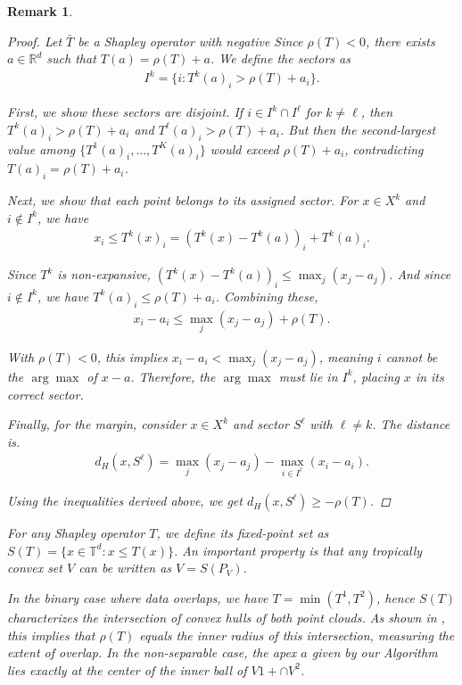 \documentclass{article}
\newtheorem{remark}{Remark}
\newcommand{\R}{\mathbb{R}}
\newcommand{\trop}{\mathbb{T}}
\begin{document}
\begin{remark}
\begin{proof}
Let $\bar{T}$ be a Shapley operator with negative 
Since $\rho(T) < 0$, there exists $a \in \R^d$ such that $T(a) = \rho(T) + a$. We define the sectors as
\begin{align}
I^k = \{i : T^k(a)_i > \rho(T) + a_i\}.
\end{align}

First, we show these sectors are disjoint. If $i \in I^k \cap I^{\ell}$ for $k \neq \ell$, then $T^k(a)_i > \rho(T) + a_i$ and $T^{\ell}(a)_i > \rho(T) + a_i$. But then the second-largest value among $\{T^1(a)_i,\ldots,T^K(a)_i\}$ would exceed $\rho(T) + a_i$, contradicting $T(a)_i = \rho(T) + a_i$.

Next, we show that each point belongs to its assigned sector. For $x \in X^k$ and $i \not\in I^k$, we have
\begin{align}
x_i \leq T^k(x)_i = (T^k(x) - T^k(a))_i + T^k(a)_i.
\end{align}

Since $T^k$ is non-expansive, $(T^k(x) - T^k(a))_i \leq \max_j(x_j - a_j)$. And since $i \not\in I^k$, we have $T^k(a)_i \leq \rho(T) + a_i$. Combining these,
\begin{align}
x_i - a_i \leq \max_j(x_j - a_j) + \rho(T).
\end{align}

With $\rho(T) < 0$, this implies $x_i - a_i < \max_j(x_j - a_j)$, meaning $i$ cannot be the $\arg\max$ of $x - a$. Therefore, the $\arg\max$ must lie in $I^k$, placing $x$ in its correct sector.

Finally, for the margin, consider $x \in X^k$ and sector $S^{\ell}$ with $\ell \neq k$. The distance is.
\begin{align}
d_H(x, S^{\ell}) = \max_j(x_j - a_j) - \max_{i \in I^{\ell}}(x_i - a_i).
\end{align}


Using the inequalities derived above, we get $d_H(x, S^{\ell}) \geq -\rho(T)$.

\end{proof}

For any Shapley operator $T$, we define its fixed-point set as $S(T) = \{x \in \trop^d : x \leq T(x)\}$. An important property is that any tropically convex set $V$ can be written as $V = S(P_V)$. 

In the binary case where data overlaps, we have $T = \min(T^1, T^2)$, hence $S(T)$ characterizes the intersection of convex hulls of both point clouds. As shown in \cite{akian2020}, this implies that $\rho(T)$ equals the inner radius of this intersection, measuring the extent of overlap. In the non-separable case, the apex $a$ given by our Algorithm lies exactly at the center of the inner ball of $V1+ \cap V^2$.


\end{remark}
\end{document}
